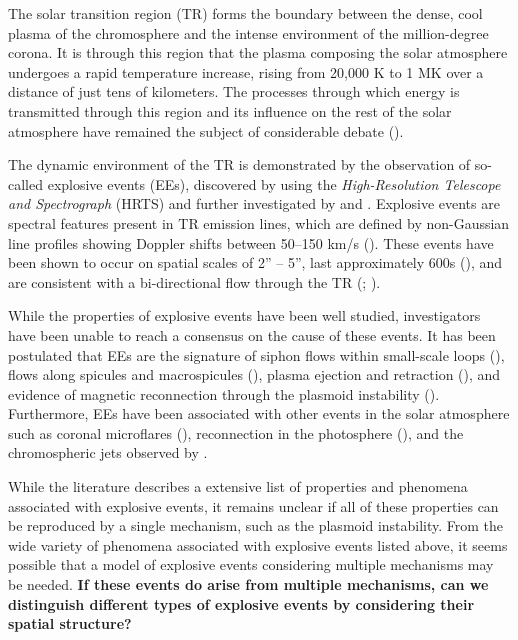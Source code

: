 \documentclass[10pt, letter]{article}
\begin{document}
			The solar transition region (TR) forms the boundary between the dense, cool plasma of the chromosphere and the intense environment of the million-degree corona. It is through this region that the plasma composing the solar atmosphere undergoes a rapid temperature increase, rising from 20,000 K to 1 MK over a distance of just tens of kilometers. The processes through which energy is transmitted through this region and its influence on the rest of the solar atmosphere have remained the subject of considerable debate (\cite{Innes2015}).
			
			The dynamic environment of the TR is demonstrated by the observation of so-called explosive events (EEs), discovered by \cite{Brueckner1983} using the \textit{High-Resolution Telescope and Spectrograph} (HRTS) and further investigated by \cite{dere1989} and \cite{Dere1994}. Explosive events are spectral features present in TR emission lines, which are defined by non-Gaussian line profiles showing Doppler shifts between 50--150 km/s (\cite{Brueckner1983}). These events have been shown to occur on spatial scales of 2'' -- 5'', last approximately 600s (\cite{dere1989}), and are consistent with a bi-directional flow through the TR (\cite{Dere1991}; \cite{Innes1997}).
			
			While the properties of explosive events have been well studied, investigators have been unable to reach a consensus on the cause of these events. It has been postulated that EEs are the signature of siphon flows within small-scale loops (\cite{Teriaca2004}), flows along spicules and macrospicules (\cite{Wilhelm2000}), plasma ejection and retraction (\cite{Huang2014}), and evidence of magnetic reconnection through the plasmoid instability (\cite{Innes2015}). Furthermore, EEs have been associated with other events in the solar atmosphere such as coronal microflares (\cite{Krucker2000}), reconnection in the photosphere (\cite{Tarbell1999}), and the chromospheric jets observed by \cite{DePontieu2011}.
			
			While the literature describes a extensive list of properties and phenomena associated with explosive events, it remains unclear if all of these properties can be reproduced by a single mechanism, such as the plasmoid instability. From the wide variety of phenomena associated with explosive events listed above, it seems possible that a model of explosive events considering multiple mechanisms may be needed. \textbf{If these events do arise from multiple mechanisms, can we distinguish different types of explosive events by considering their spatial structure?}
			
\end{document}
